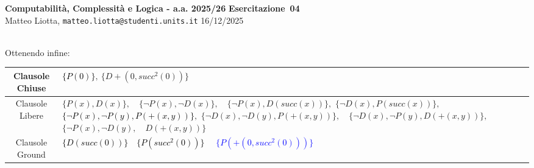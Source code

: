 \documentclass[a4paper,10pt]{article}
\makeatletter
\newcommand{\DocType}{Esercitazione} %
\newcommand{\FullTitle}{\DocType\ \EsercitazioneNum}
\newcommand{\Header}{
\noindent
  \small \textbf{Computabilità, Complessità e Logica - a.a. 2025/26} \hfill \textbf{\FullTitle} \\[0.2cm]
  \scriptsize Matteo Liotta, \texttt{matteo.liotta@studenti.units.it} \hfill \Data \\[0.2cm]
  \noindent\makebox[\linewidth]{\rule{\linewidth}{0.4pt}} \\[0.3cm]}
\newcommand{\NewPageHeader}{
  \vfill
  \noindent\makebox[\linewidth]{\rule{\linewidth}{0.4pt}}
  \newpage
  {\Header}
}
\newcommand{\EsercitazioneNum}{04}
\newcommand{\Data}{16/12/2025}
\makeatother
\begin{document}
\NewPageHeader

Ottenendo infine:

\begin{table}[h]
    \centering
    \small 
    \renewcommand{\arraystretch}{1.5} 
    
    \begin{tabularx}{\textwidth}{|c|>{\centering\arraybackslash}X|}
        \hline
        Clausole Chiuse & \textcolor{black}{$\{P(0)\}$}$, \ \{D+(0,succ^2(0))\}$ \\
        \hline
        Clausole Libere & 
            $\{P(x), D(x)\},\quad \{\lnot P(x), \lnot D(x)\},\quad \{\lnot P(x), D(succ(x))\},$\newline
            $\{\lnot D(x), P(succ(x))\},\quad $\textcolor{black}{$\{\lnot P(x), \lnot P(y), P(+(x, y))\}$}$,$\newline
            $\{\lnot D(x), \lnot D(y), P(+(x, y))\},\quad \{\lnot D(x), \lnot P(y), D(+(x, y))\},$\newline
            $\{\lnot P(x), \lnot D(y),\quad D(+(x, y))\}$ 
            \\
        \hline
        Clausole Ground & \textcolor{black}{$\{D(succ(0))\}\quad$}\textcolor{black}{$\{P(succ^2(0))\}\quad$}
        \textcolor{blue}{$\{P(+(0, succ^2(0)))\}$}
        \\
        \hline
    \end{tabularx}
\end{table}
\end{document}
